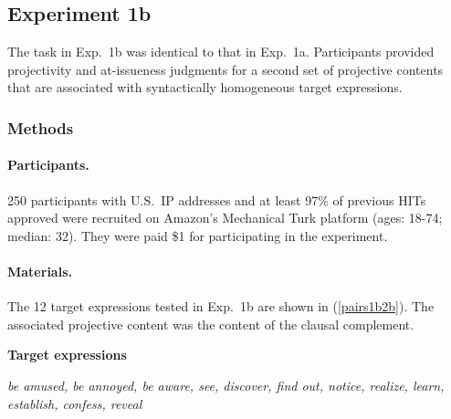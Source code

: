 \documentclass[11pt,fleqn]{article}
\newcommand{\6}{\mbox{$[\hspace*{-.6mm}[$}}
\newcommand{\9}{\mbox{$]\hspace*{-.6mm}]$}}
\begin{document}
\subsection{Experiment 1b}\label{s-exp1b} 

The task in Exp.~1b was identical to that in Exp.~1a. Participants provided projectivity and at-issueness judgments for a second set of projective contents that are associated with syntactically homogeneous target expressions.



\subsubsection{Methods}

\paragraph{Participants.} 250 participants with U.S.\ IP addresses and at least 97\% of previous HITs approved were recruited on Amazon's Mechanical Turk platform (ages: 18-74; median: 32). They were paid \$1 for participating in the experiment.

\paragraph{Materials.} The 12 target expressions tested in Exp.~1b are shown in (\ref{pairs1b2b}). The associated projective content was the content of the clausal complement.

\begin{exe}
\ex\label{pairs1b2b} {\bf Target expressions}

{\em be amused, be annoyed, be aware, see, discover, find out, notice, realize, learn, establish, confess, reveal} 

\end{exe}
\end{document}
